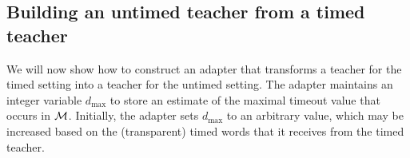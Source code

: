 


\subsection{Building an untimed teacher from a timed teacher}
We will now show how to construct an adapter that transforms a teacher for the timed setting into a teacher for the untimed setting.
The adapter maintains an integer variable $d_{\max}$ to store an estimate of the maximal timeout value that occurs in ${\mathcal M}$. Initially, the
adapter sets $d_{\max}$ to an arbitrary value, which may be increased based on the (transparent) timed words that it receives from
the timed teacher.

